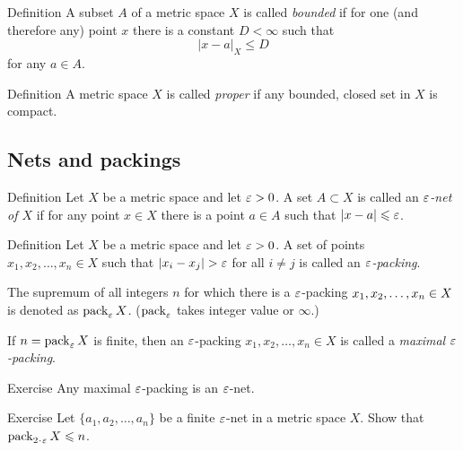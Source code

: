 \begin{thm}{Definition}
A subset $A$ of a metric space $X$ is called \emph{bounded} if for one (and therefore any) point $x$ there is a constant $D<\infty$ such that 
$$|x-a|_X\le D$$ for any $a\in A$.
\end{thm}


\begin{thm}{Definition}\label{def:proper}
A metric space $X$ is called \emph{proper} if any bounded, 
closed set in $X$ is compact.
\end{thm}



\subsection*{Nets and packings}

\begin{thm}{Definition}
Let $X$ be a metric space and let $\varepsilon>0$.
A set $A\subset X$ is called an \emph{$\varepsilon$-net of $X$} if for any point $x\in X$ there is a point $a\in A$
such that $|x-a|\leqslant\varepsilon$.
\end{thm}

\begin{thm}{Definition}
Let $X$ be a metric space and let $\varepsilon>0$.
A set of points $x_1,x_2,\dots,x_n\in X$ such that $|x_i-x_j|>\eps$ for all $i\not=j$ is called an \emph{$\varepsilon$-packing}.

The supremum of all integers $n$ for which 
there is a $\varepsilon$-packing $x_1,x_2,\dots,x_n\z\in X$ 
is denoted as $\operatorname{pack}_\varepsilon X$.
($\operatorname{pack}_\varepsilon$ takes integer value or $\infty$.)

If $n=\operatorname{pack}_\varepsilon X$ is finite,
then an $\varepsilon$-packing $x_1,x_2,\dots,x_n\in X$ 
is called a \emph{maximal $\varepsilon$-packing}.
\end{thm}

\begin{thm}{Exercise}\label{ex:packing=net}
Any maximal $\varepsilon$-packing is an $\varepsilon$-net.
\end{thm}

\begin{thm}{Exercise}\label{ex:net=2packing}
Let $\{a_1,a_2,\dots,a_n\}$ be a finite $\varepsilon$-net in a metric space $X$.
Show that $\pack_{2\cdot\eps}X\le n$.
\end{thm}

